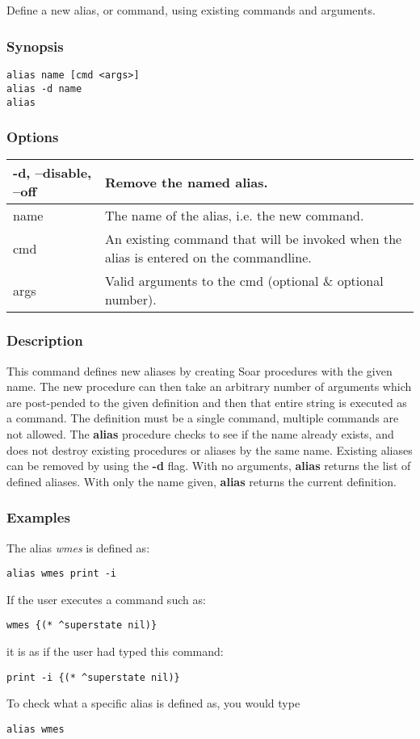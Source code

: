 \subsection{}
\label{alias}
Define a new alias, or command, using existing commands and arguments. 
\subsubsection*{Synopsis}
  \begin{verbatim}
alias name [cmd <args>]
alias -d name
alias
\end{verbatim}
\subsubsection*{Options}
\begin{tabular}{|l|l|}
\hline 
 -d, --disable, --off  & Remove the named alias.  \\
 \hline 
 name  & The name of the alias, i.e. the new command.  \\
 \hline 
 cmd  & An existing command that will be invoked when the alias is entered on the commandline.  \\
 \hline 
 args  & Valid arguments to the cmd (optional \& optional number).  \\
 \hline 
\end{tabular}
\subsubsection*{Description}
 This command defines new aliases by creating Soar procedures with the given name. The new procedure can then take an arbitrary number of arguments which are post-pended to the given definition and then that entire string is executed as a command. The definition must be a single command, multiple commands are not allowed. The \textbf{alias}
 procedure checks to see if the name already exists, and does not destroy existing procedures or aliases by the same name. Existing aliases can be removed by using the \textbf{-d}
 flag. With no arguments, \textbf{alias}
 returns the list of defined aliases. With only the name given, \textbf{alias}
 returns the current definition. 
\subsubsection*{Examples}
 The alias \emph{wmes}
 is defined as: \begin{verbatim}
alias wmes print -i
\end{verbatim}
 If the user executes a command such as: \begin{verbatim}
wmes {(* ^superstate nil)}
\end{verbatim}
 it is as if the user had typed this command: \begin{verbatim}
print -i {(* ^superstate nil)}
\end{verbatim}
 To check what a specific alias is defined as, you would type \begin{verbatim}
alias wmes
\end{verbatim}

